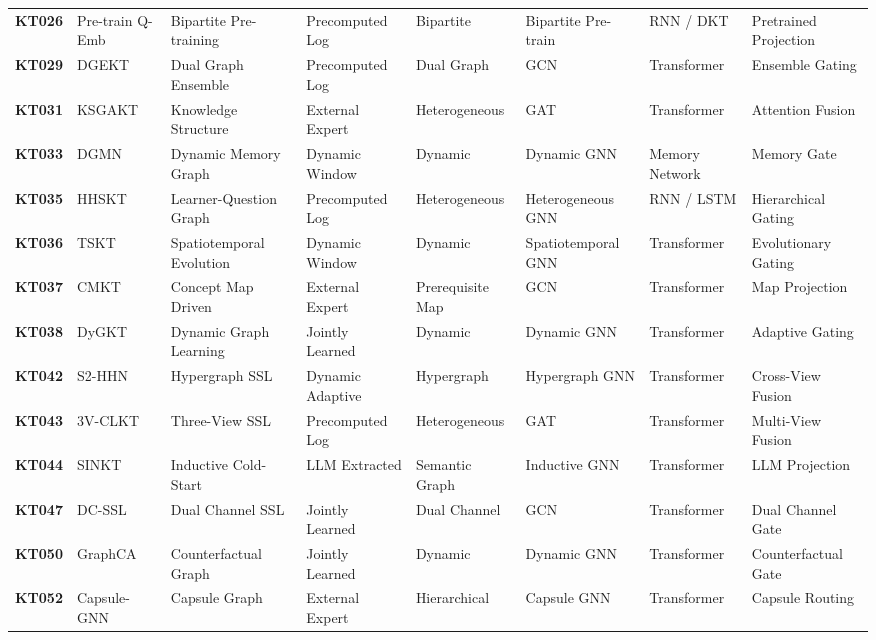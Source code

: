 \documentclass[journal]{IEEEtran}
\begin{document}
\begin{table}[t]
{\begin{tabular}{llllllll}
\textbf{KT026} & Pre-train Q-Emb \cite{KT026_PretrainQ_2020} & Bipartite Pre-training & Precomputed Log & Bipartite & Bipartite Pre-train & RNN / DKT & Pretrained Projection \\
\textbf{KT029} & DGEKT \cite{KT029_DGEKT_2024} & Dual Graph Ensemble & Precomputed Log & Dual Graph & GCN & Transformer & Ensemble Gating \\
\textbf{KT031} & KSGAKT \cite{KT031_KSGAKT_2022} & Knowledge Structure & External Expert & Heterogeneous & GAT & Transformer & Attention Fusion \\
\textbf{KT033} & DGMN \cite{KT033_DGMN_2023} & Dynamic Memory Graph & Dynamic Window & Dynamic & Dynamic GNN & Memory Network & Memory Gate \\
\textbf{KT035} & HHSKT \cite{KT035_HHSKT_2023} & Learner-Question Graph & Precomputed Log & Heterogeneous & Heterogeneous GNN & RNN / LSTM & Hierarchical Gating \\
\textbf{KT036} & TSKT \cite{KT036_TSKT_2024} & Spatiotemporal Evolution & Dynamic Window & Dynamic & Spatiotemporal GNN & Transformer & Evolutionary Gating \\
\textbf{KT037} & CMKT \cite{KT037_CMKT_2022} & Concept Map Driven & External Expert & Prerequisite Map & GCN & Transformer & Map Projection \\
\textbf{KT038} & DyGKT \cite{KT038_DyGKT_2024} & Dynamic Graph Learning & Jointly Learned & Dynamic & Dynamic GNN & Transformer & Adaptive Gating \\
\textbf{KT042} & S2-HHN \cite{KT042_S2HHN_2023} & Hypergraph SSL & Dynamic Adaptive & Hypergraph & Hypergraph GNN & Transformer & Cross-View Fusion \\
\textbf{KT043} & 3V-CLKT \cite{KT043_3VCLKT_2024} & Three-View SSL & Precomputed Log & Heterogeneous & GAT & Transformer & Multi-View Fusion \\
\textbf{KT044} & SINKT \cite{KT044_SINKT_2024} & Inductive Cold-Start & LLM Extracted & Semantic Graph & Inductive GNN & Transformer & LLM Projection \\
\textbf{KT047} & DC-SSL \cite{KT047_DCSSL_2023} & Dual Channel SSL & Jointly Learned & Dual Channel & GCN & Transformer & Dual Channel Gate \\
\textbf{KT050} & GraphCA \cite{KT050_GraphCA_2023} & Counterfactual Graph & Jointly Learned & Dynamic & Dynamic GNN & Transformer & Counterfactual Gate \\
\textbf{KT052} & Capsule-GNN \cite{KT052_CapsuleGNN_2022} & Capsule Graph & External Expert & Hierarchical & Capsule GNN & Transformer & Capsule Routing \\

\end{tabular}}
\end{table}
\end{document}
